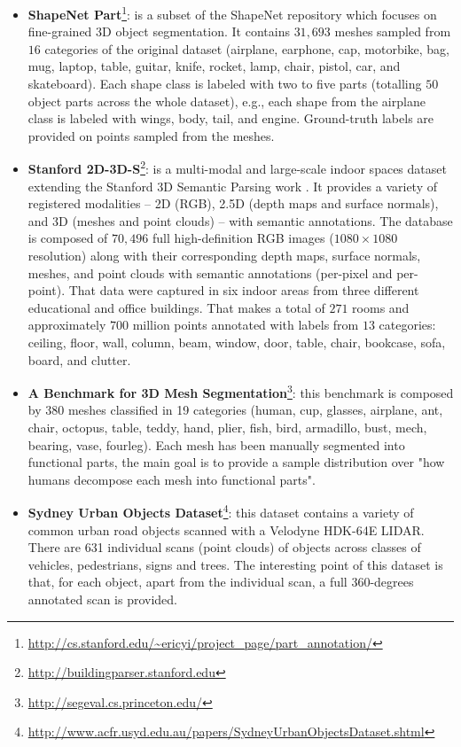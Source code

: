 \begin{itemize}
	\item \textbf{ShapeNet Part}\cite{Yi2016}\footnote{\url{http://cs.stanford.edu/~ericyi/project_page/part_annotation/}}: is a subset of the ShapeNet\cite{Chang2015} repository which focuses on fine-grained 3D object segmentation. It contains $31,693$ meshes sampled from $16$ categories of the original dataset (airplane, earphone, cap, motorbike, bag, mug, laptop, table, guitar, knife, rocket, lamp, chair, pistol, car, and skateboard). Each shape class is labeled with two to five parts (totalling $50$ object parts across the whole dataset), e.g., each shape from the airplane class is labeled with wings, body, tail, and engine. Ground-truth labels are provided on points sampled from the meshes.

	\item \textbf{Stanford 2D-3D-S}\cite{Armeni2017}\footnote{\url{http://buildingparser.stanford.edu}}: is a multi-modal and large-scale indoor spaces dataset extending the Stanford 3D Semantic Parsing work \cite{Armeni2016}. It provides a variety of registered modalities -- 2D (RGB), 2.5D (depth maps and surface normals), and 3D (meshes and point clouds) --  with semantic annotations. The database is composed of $70,496$ full high-definition RGB images ($1080\times1080$ resolution) along with their corresponding depth maps, surface normals, meshes, and point clouds with semantic annotations (per-pixel and per-point). That data were captured in six indoor areas from three different educational and office buildings. That makes a total of $271$ rooms and approximately $700$ million points annotated with labels from $13$ categories: ceiling, floor, wall, column, beam, window, door, table, chair, bookcase, sofa, board, and clutter.

	\item \textbf{A Benchmark for 3D Mesh Segmentation}\cite{Chen:2009:ABF}\footnote{\url{http://segeval.cs.princeton.edu/}}: this benchmark is composed by 380 meshes classified in 19 categories (human, cup, glasses, airplane, ant, chair, octopus, table, teddy, hand, plier, fish, bird, armadillo, bust, mech, bearing, vase, fourleg). Each mesh has been manually segmented into functional parts, the main goal is to provide a sample distribution over "how humans decompose each mesh into functional parts".

	\item \textbf{Sydney Urban Objects Dataset}\cite{quadros2012feature}\footnote{\url{http://www.acfr.usyd.edu.au/papers/SydneyUrbanObjectsDataset.shtml}}: this dataset contains a variety of common urban road objects scanned with a Velodyne HDK-64E LIDAR. There are 631 individual scans (point clouds) of objects across classes of vehicles, pedestrians, signs and trees. The interesting point of this dataset is that, for each object, apart from the individual scan, a full 360-degrees annotated scan is provided.


\end{itemize}
